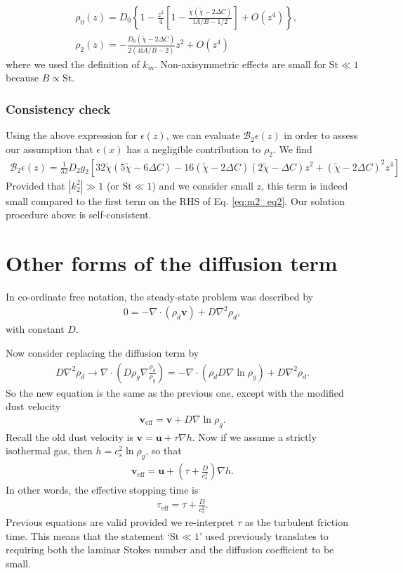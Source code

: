\documentclass[12pt]{article} %
\begin{document}
\begin{align}
&\rho_0(z) =D_0\left\{1 -
  \frac{z^2}{4}\left[1-\frac{\tilde{\chi}\left(\tilde{\chi} - 2\Delta C\right)}{\mathrm{i}A/B - 1/2}\right]
+ O(z^4)\right\},\\
&\rho_2(z) =-\frac{D_0\left(\tilde{\chi} - 2\Delta C\right)}{2\left(4\mathrm{i}A/B - 2\right)}z^2+O(z^4)
\end{align}
where we used the definition of $k_m$. Non-axisymmetric effects are small for $\mathrm{St}\ll1$ because $B\propto \mathrm{St}$. 

\subsubsection{Consistency check}
Using the above expression for $\epsilon(z)$, we can evaluate
$\mathcal{B}_2\epsilon(z)$ in order to assess our assumption that
$\epsilon(x)$ has a negligible contribution to $\rho_2$. We find
\begin{align}
\mathcal{B}_2\epsilon(z) = \frac{1}{32}D_2g_2
\left[32\tilde{\chi}(5\tilde{\chi} - 6\Delta C) - 16(\tilde{\chi}-2\Delta C)(2\tilde{\chi}-\Delta C)z^2
+(\tilde{\chi} - 2\Delta C)^2z^4\right]
\end{align}
Provided that $|k_2^2|\gg1$ (or $\mathrm{St}\ll 1$) and we consider small $z$,  
this term is indeed small compared to the  first term on the RHS of Eq. \ref{eq:m2_eq2}.  Our solution procedure above is self-consistent.  


\section{Other forms of the diffusion term}
In co-ordinate free notation, the steady-state problem was described by
\begin{align}
0 = -\nabla\cdot(\rho_d\bm{v}) + D\nabla^2\rho_d,
\end{align}
with constant $D$. 

Now consider replacing the diffusion term by 
\begin{align}
D\nabla^2\rho_d \to \nabla\cdot\left(D\rho_g\nabla\frac{\rho_d}{\rho_g}\right) 
= -\nabla\cdot\left(\rho_d D\nabla\ln{\rho_g}\right) + D\nabla^2\rho_d.
\end{align}
So the new equation is the same as the previous one, except with the modified dust velocity
\begin{align}
\bm{v}_\mathrm{eff} =\bm{v} + D\nabla\ln{\rho_g}. 
\end{align}
Recall the old dust velocity is $\bm{v} = \bm{u} + \tau\nabla h$. Now if we assume a strictly isothermal gas, then $h=c_s^2\ln\rho_g$, so that
\begin{align}
\bm{v}_\mathrm{eff} =\bm{u}  +\left(\tau +\frac{D}{c_s^2}\right)\nabla h.   
\end{align}
In other words, the effective stopping time is
\begin{align}
\tau_\mathrm{eff} = \tau + \frac{D}{c_s^2}.
\end{align}
Previous equations are valid provided we re-interpret $\tau$ as the turbulent friction time. This means that the statement `$\mathrm{St}\ll1$' used previously translates to requiring both the laminar Stokes number and the diffusion coefficient to be small. 
\end{document}
